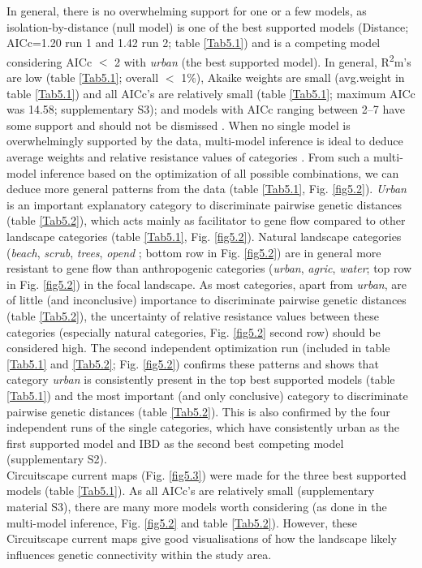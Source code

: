 \documentclass[10pt, twoside]{book} %
\begin{document}
	In general, there is no overwhelming support for one or a few models, as isolation-by-distance (null model) is one of the best supported models (Distance; \textDelta AICc=1.20 run 1 and 1.42 run 2; table \ref{Tab5.1}) and is a competing model considering \textDelta AICc $<$ 2 with \textit{urban} (the best supported model). In general, R\textsuperscript{2}m's are low (table \ref{Tab5.1}; overall $<$ 1$\%$), Akaike weights are small (avg.weight in table \ref{Tab5.1}) and all \textDelta AICc's are relatively small (table \ref{Tab5.1}; maximum \textDelta AICc was 14.58; supplementary S3); and models with \textDelta AICc ranging between 2--7 have some support and should not be dismissed \citep{burnham2011}. When no single model is overwhelmingly supported by the data, multi-model inference is ideal to deduce average weights and relative resistance values of categories \citep{johnson2004}. From such a multi-model inference based on the optimization of all possible combinations, we can deduce more general patterns from the data (table \ref{Tab5.1}, Fig. \ref{fig5.2}). \textit{Urban} is an important explanatory category to discriminate pairwise genetic distances (table \ref{Tab5.2}), which acts mainly as facilitator to gene flow compared to other landscape categories (table \ref{Tab5.1}, Fig. \ref{fig5.2}). Natural landscape categories (\textit{beach}, \textit{scrub}, \textit{trees}, \textit{opend} ; bottom row in Fig. \ref{fig5.2}) are in general more resistant to gene flow than anthropogenic categories (\textit{urban}, \textit{agric}, \textit{water}; top row in Fig. \ref{fig5.2}) in the focal landscape. As most categories, apart from \textit{urban}, are of little (and inconclusive) importance to discriminate pairwise genetic distances (table \ref{Tab5.2}), the uncertainty of relative resistance values between these categories (especially natural categories, Fig. \ref{fig5.2} second row) should be considered high. The second independent optimization run (included in table \ref{Tab5.1} and \ref{Tab5.2}; Fig. \ref{fig5.2}) confirms these patterns and shows that category \textit{urban} is consistently present in the top best supported models (table \ref{Tab5.1}) and the most important (and only conclusive) category to discriminate pairwise genetic distances (table \ref{Tab5.2}). This is also confirmed by the four independent runs of the single categories, which have consistently urban as the first supported model and IBD as the second best competing model (supplementary S2).\\
	
	Circuitscape current maps (Fig. \ref{fig5.3}) were made for the three best supported models (table \ref{Tab5.1}). As all \textDelta AICc's are relatively small (supplementary material S3), there are many more models worth considering (as done in the multi-model inference, Fig. \ref{fig5.2} and table \ref{Tab5.2}). However, these Circuitscape current maps give good visualisations of how the landscape likely influences genetic connectivity within the study area.\\
	
\end{document}
